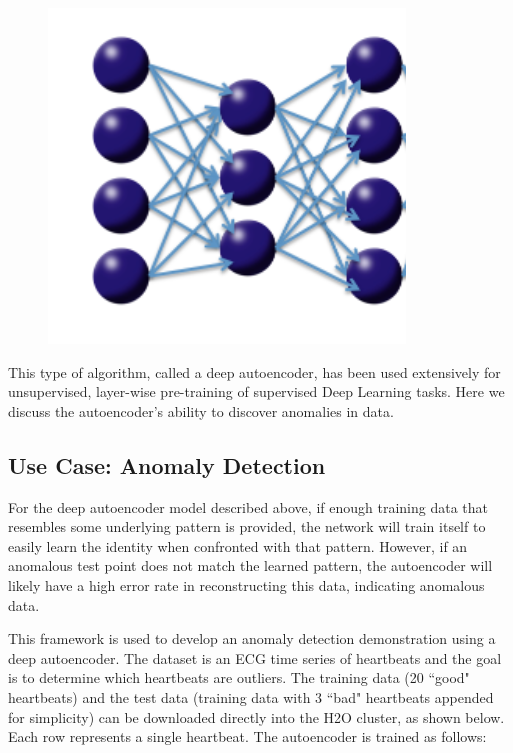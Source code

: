 {{\begin{figure}[h!]
\centering
\includegraphics[scale=0.6]{autoencoder.png}
\end{figure}

This type of algorithm, called a deep autoencoder, has been used extensively for unsupervised, layer-wise pre-training of supervised Deep Learning tasks. Here we discuss the autoencoder's ability to discover anomalies in data. 



\subsection{Use Case: Anomaly Detection} %
For the deep autoencoder model described above,  if enough training data that resembles some underlying pattern is provided, the network will train itself to easily learn the identity when confronted with that pattern. However, if an anomalous test point does not match the learned pattern, the autoencoder will likely have a high error rate in reconstructing this data, indicating anomalous data.

This framework is used to develop an anomaly detection demonstration using a deep autoencoder. The dataset is an ECG time series of heartbeats and the goal is to determine which heartbeats are outliers. The training data (20 ``good" heartbeats) and the test data (training data with 3 ``bad" heartbeats appended for simplicity) can be downloaded directly into the H2O cluster, as shown below.  Each row represents a single heartbeat. The autoencoder is trained as follows: 

}}
